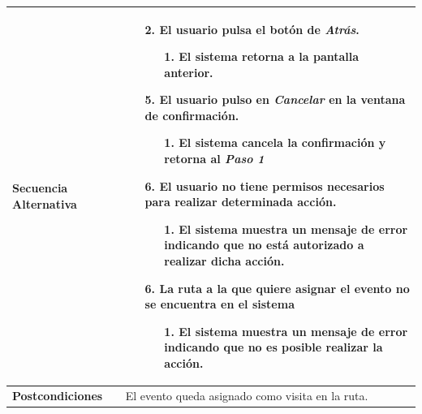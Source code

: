 \begin{longtable}{| p{4cm} | p{10cm} |}
\\
\hline
\textbf{Secuencia Alternativa} &\mbox{}\par\vspace{-\baselineskip}
\begin{enumerate}[leftmargin=0.9cm, topsep=0.1cm]
\item[2.] El usuario pulsa el botón de \textit{Atrás}.
	\begin{itemize}
	\item[1.] El sistema retorna a la pantalla anterior.
	\end{itemize}
\item[5.] El usuario pulso en \textit{Cancelar} en la ventana de confirmación.
	\begin{itemize}
	\item[1.] El sistema cancela la confirmación y retorna al \textit{Paso 1}
	\end{itemize}
\item[6.] El usuario no tiene permisos necesarios para realizar determinada acción.
	\begin{itemize}
	\item[1.] El sistema muestra un mensaje de error indicando que no está autorizado a realizar dicha acción.
	\end{itemize}
\item[6.] La ruta a la que quiere asignar el evento no se encuentra en el sistema
	\begin{itemize}
	\item[1.] El sistema muestra un mensaje de error indicando que no es posible realizar la acción.
	\end{itemize}
\end{enumerate}
\\

\hline
\textbf{Postcondiciones} & 
El evento queda asignado como visita en la ruta.\\
\hline
\end{longtable}



\newpage
